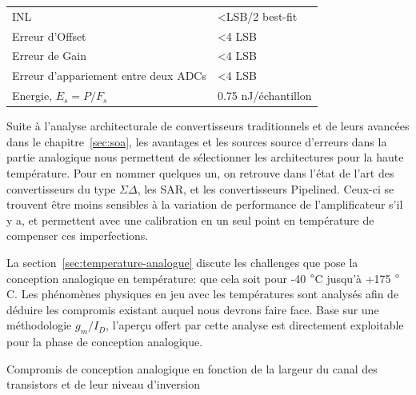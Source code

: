 \begin{mdframed}[linecolor=Prune,linewidth=1]
\begin{center}
\begin{tabular}{ll}
    INL                              & \textless LSB/2 best-fit                                                                                                                             \\
    Erreur d'Offset                     & \textless 4 LSB                                                                                                                                             \\
    Erreur de Gain                       & \textless 4 LSB                                                                                                                                             \\
    Erreur d'appariement entre deux ADCs      & \textless 4 LSB                                                                                                                                             \\
    Energie, $E_s = P/F_s$            & 0.75 nJ/échantillon      \\ \bottomrule                                                                                                                                       
    \end{tabular}
\end{center}

Suite à l’analyse architecturale de convertisseurs traditionnels et de leurs avancées dans le chapitre~\ref{sec:soa}, les avantages et les sources source d’erreurs dans la partie analogique nous permettent de sélectionner les architectures pour la haute température. Pour en nommer quelques un, on retrouve dans l’état de l’art des convertisseurs du type \(\Sigma \Delta\), les SAR, et les convertisseurs Pipelined. Ceux-ci se trouvent être moins sensibles à la variation de performance de l’amplificateur s'il y a, et permettent avec une calibration en un seul point en température de compenser ces imperfections.

La section~\ref{sec:temperature-analogue} discute les challenges que pose la conception analogique en température: que cela soit pour -40 \(\degree\)C jusqu’à +175 \(\degree\)C. Les phénomènes physiques en jeu avec les températures sont analysés afin de déduire les compromis existant auquel nous devrons faire face.  Base sur une méthodologie \(g_m/I_D\), l’aperçu offert par cette analyse est directement exploitable pour la phase de conception analogique.

\begin{center}
    \centering
    
    \caption[]{Compromis de conception analogique en fonction de la largeur du canal des transistors et de leur niveau d'inversion}
    \label{fig:tradeoffs-fr}
\end{center}


\end{mdframed}
